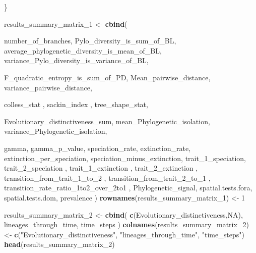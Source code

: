 \documentclass[]{book}
\newenvironment{Shaded}{\begin{snugshade}}{\end{snugshade}}
\newcommand{\KeywordTok}[1]{\textcolor[rgb]{0.13,0.29,0.53}{\textbf{{#1}}}}
\newcommand{\DecValTok}[1]{\textcolor[rgb]{0.00,0.00,0.81}{{#1}}}
\newcommand{\StringTok}[1]{\textcolor[rgb]{0.31,0.60,0.02}{{#1}}}
\newcommand{\OtherTok}[1]{\textcolor[rgb]{0.56,0.35,0.01}{{#1}}}
\newcommand{\NormalTok}[1]{{#1}}
\theoremstyle{definition}
\theoremstyle{definition}
\theoremstyle{remark}
\begin{document}
\begin{Shaded}
\begin{Highlighting}[]
{\NormalTok{    \}}

\NormalTok{    results_summary_matrix_}\DecValTok{1}\NormalTok{ <-}\StringTok{ }\KeywordTok{cbind}\NormalTok{(}

\NormalTok{      number_of_branches,}
\NormalTok{      Pylo_diversity_is_sum_of_BL,}
\NormalTok{      average_phylogenetic_diversity_is_mean_of_BL,}
\NormalTok{      variance_Pylo_diversity_is_variance_of_BL,}

\NormalTok{      F_quadratic_entropy_is_sum_of_PD,}
\NormalTok{      Mean_pairwise_distance,}
\NormalTok{      variance_pairwise_distance,}

\NormalTok{      colless_stat ,}
\NormalTok{      sackin_index ,}
\NormalTok{      tree_shape_stat,}

\NormalTok{      Evolutionary_distinctiveness_sum,}
\NormalTok{      mean_Phylogenetic_isolation,}
\NormalTok{      variance_Phylogenetic_isolation,}

\NormalTok{      gamma,}
\NormalTok{      gamma_p_value,}
\NormalTok{      speciation_rate,}
\NormalTok{      extinction_rate,}
\NormalTok{      extinction_per_speciation,}
\NormalTok{      speciation_minus_extinction,}
\NormalTok{      trait_1_speciation,}
\NormalTok{      trait_2_speciation ,}
\NormalTok{      trait_1_extinction ,}
\NormalTok{      trait_2_extinction ,}
\NormalTok{      transition_from_trait_1_to_}\DecValTok{2}\NormalTok{ ,}
\NormalTok{      transition_from_trait_2_to_}\DecValTok{1}\NormalTok{ ,}
\NormalTok{      transition_rate_ratio_1to2_over_2to1 ,}
\NormalTok{      Phylogenetic_signal,}
\NormalTok{      spatial.tests.fora,}
\NormalTok{      spatial.tests.dom,}
\NormalTok{      prevalence}
\NormalTok{    )}
    \KeywordTok{rownames}\NormalTok{(results_summary_matrix_}\DecValTok{1}\NormalTok{) <-}\StringTok{ }\DecValTok{1}

\NormalTok{    results_summary_matrix_}\DecValTok{2}\NormalTok{ <-}\StringTok{ }\KeywordTok{cbind}\NormalTok{(}
      \KeywordTok{c}\NormalTok{(Evolutionary_distinctiveness,}\OtherTok{NA}\NormalTok{),}
\NormalTok{      lineages_through_time,}
\NormalTok{      time_steps}
\NormalTok{    )}
    \KeywordTok{colnames}\NormalTok{(results_summary_matrix_}\DecValTok{2}\NormalTok{) <-}\StringTok{ }\KeywordTok{c}\NormalTok{(}\StringTok{"Evolutionary_distinctiveness"}\NormalTok{,}
                                            \StringTok{"lineages_through_time"}\NormalTok{, }\StringTok{"time_steps"}\NormalTok{)}
    \KeywordTok{head}\NormalTok{(results_summary_matrix_}\DecValTok{2}\NormalTok{)}

}
\end{Highlighting}
\end{Shaded}
\end{document}
